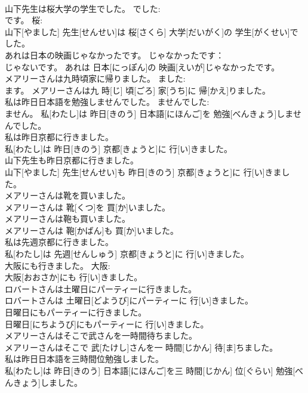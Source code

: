 \documentclass[8pt]{extreport}
\begin{document}
\begin{CJK}{UTF8}{min}
\\	山下先生は桜大学の学生でした。	でした: 
\\	です。 桜: 
\\	山下[やました] 先生[せんせい]は 桜[さくら] 大学[だいがく]の 学生[がくせい]でした。	
\\	あれは日本の映画じゃなかったです。	じゃなかったです：
\\	じゃないです。	あれは 日本[にっぽん]の 映画[えいが]じゃなかったです。	
\\	メアリーさんは九時頃家に帰りました。	ました: 
\\	ます。	メアリーさんは九 時[じ] 頃[ごろ] 家[うち]に 帰[かえ]りました。	
\\	私は昨日日本語を勉強しませんでした。	ませんでした: 
\\	ません。	私[わたし]は 昨日[きのう] 日本語[にほんご]を 勉強[べんきょう]しませんでした。	
\\	私は昨日京都に行きました。	
\\	私[わたし]は 昨日[きのう] 京都[きょうと]に 行[い]きました。	
\\	山下先生も昨日京都に行きました。	
\\	山下[やました] 先生[せんせい]も 昨日[きのう] 京都[きょうと]に 行[い]きました。	
\\	メアリーさんは靴を買いました。	
\\	メアリーさんは 靴[くつ]を 買[か]いました。	
\\	メアリーさんは鞄も買いました。	
\\	メアリーさんは 鞄[かばん]も 買[か]いました。	
\\	私は先週京都に行きました。	
\\	私[わたし]は 先週[せんしゅう] 京都[きょうと]に 行[い]きました。	
\\	大阪にも行きました。	大阪: 
\\	大阪[おおさか]にも 行[い]きました。	
\\	ロバートさんは土曜日にパーティーに行きました。	
\\	ロバートさんは 土曜日[どようび]にパーティーに 行[い]きました。	
\\	日曜日にもパーティーに行きました。	
\\	日曜日[にちようび]にもパーティーに 行[い]きました。	
\\	メアリーさんはそこで武さんを一時間待ちました。	
\\	メアリーさんはそこで 武[たけし]さんを一 時間[じかん] 待[ま]ちました。	
\\	私は昨日日本語を三時間位勉強しました。	
\\	私[わたし]は 昨日[きのう] 日本語[にほんご]を三 時間[じかん] 位[ぐらい] 勉強[べんきょう]しました。	

\end{CJK}
\end{document}
